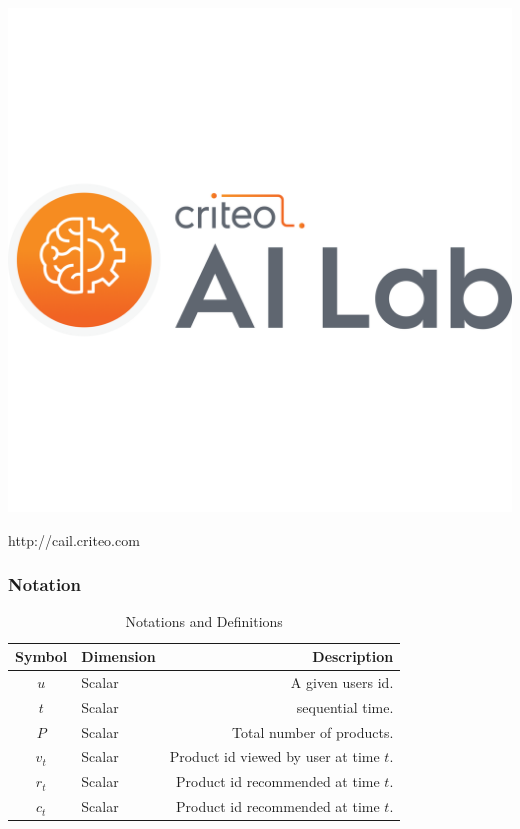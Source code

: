 




\begin{frame}
  \centerline{\includegraphics[height=0.7\textheight]{images/cail.png}}
  \centerline{http://cail.criteo.com}
\end{frame}



\begin{frame}[fragile]
  \frametitle{Notation}

\begin{table}
  \begin{tabular}{c l r}
    \toprule
    \textbf{Symbol} & \textbf{Dimension} & \textbf{Description} \\ 
    \midrule
    \midrule
    $u$ & Scalar & A given users id.  \\
    $t$ & Scalar & sequential time. \\%
    $P$ & Scalar & Total number of products. \\
    $v_{t}$ & Scalar & Product id viewed by user at time $t$.\\
    $r_{t}$ & Scalar & Product id recommended at time $t$.\\
    $c_{t}$ & Scalar & Product id recommended at time $t$.  \\  
    \bottomrule    
    \end{tabular}
    \caption{Notations and Definitions} 
    \vskip -15pt
    \label{tab:notation}
  \end{table}
\end{frame}



